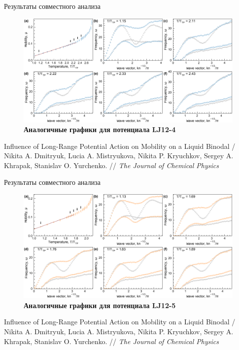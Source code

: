 \documentclass{beamer}
\begin{document}
\begin{frame}{Результаты совместного анализа}
\footnotesize{

\begin{figure}
\centering
\includegraphics[width=\textwidth]{MACR-Figure5}
\caption{\footnotesize \textbf{Аналогичные графики для потенциала LJ12-4}}
\label{Figure4}
\end{figure}

}

\tiny{Influence of Long-Range Potential Action on Mobility on a Liquid Binodal / Nikita A. Dmitryuk, Lucia A. Mistryukova, Nikita P. Kryuchkov, Sergey A. Khrapak, Stanislav O. Yurchenko. // \textit{The Journal of Chemical Physics}}
\end{frame}





\begin{frame}{Результаты совместного анализа}
\footnotesize{

\begin{figure}
\centering
\includegraphics[width=\textwidth]{MACR-Figure6}
\caption{\footnotesize \textbf{Аналогичные графики для потенциала LJ12-5}}
\label{Figure4}
\end{figure}

}

\tiny{Influence of Long-Range Potential Action on Mobility on a Liquid Binodal / Nikita A. Dmitryuk, Lucia A. Mistryukova, Nikita P. Kryuchkov, Sergey A. Khrapak, Stanislav O. Yurchenko. // \textit{The Journal of Chemical Physics}}
\end{frame}
\end{document}
